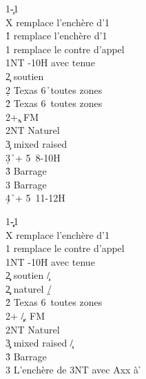 \documentclass[a4paper]{article}
\begin{document}
\begin{bidtable}
1\c-1\d\\
X \> remplace l'enchère d'1\h \\
1\h \> remplace l'enchère d'1\s \\
1\s \> remplace le contre d'appel\\
1NT -10H avec tenue\\
2\c \> soutien \c \\
2\d \> Texas 6\h\ toutes zones\\
2\h \> Texas 6\s\ toutes zones\\
2\s {}+\c , FM\\
2NT \> Naturel\\
3\c \> mixed raised \c \\
3\d {}\h\ + 5\s\ 8-10H\\
3\h \> Barrage \h \\
3\s \> Barrage \s \\
4\d {}\h\ + 5\s\ 11-12H
\end{bidtable}

\begin{bidtable}
1\c\d-1\h\\
X \> remplace l'enchère d'1\s \\
1\s \> remplace le contre d'appel\\
1NT -10H avec tenue\\
2\c\d \> soutien \c /\d \\
2\d\c \> naturel \d /\c \\
2\h \> Texas 6\s\ toutes zones\\
2\s {}+ \c /\d , FM\\
2NT \> Naturel\\
3\c\d \> mixed raised \c /\d \\
3\h \> Barrage \s \\
3\s \> L'enchère de 3NT avec Axx à \h 
\end{bidtable}
\end{document}
